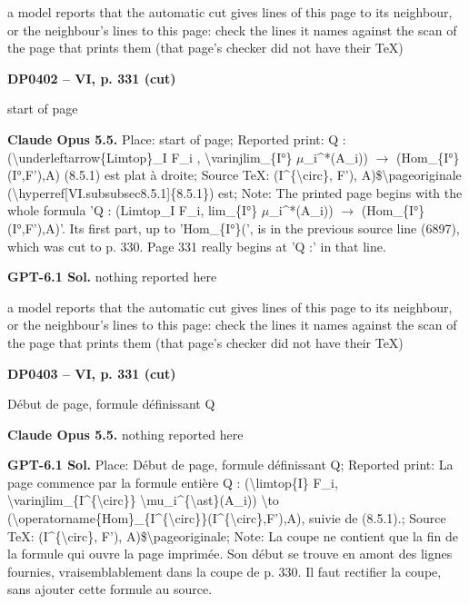 a model reports that the automatic cut gives lines of this page to its neighbour, or the neighbour's lines to this page: check the lines it names against the scan of the page that prints them (that page's checker did not have their TeX)\par
\par\noindent\hypertarget{DP0402}{}\textbf{DP0402 -- VI, p. 331 (cut)}\par
start of page\par
\textbf{Claude Opus 5.5.} Place: start of page; Reported print: Q : (\textbackslash{}underleftarrow\{Limtop\}\_I F\_i , \textbackslash{}varinjlim\_\{I°\} \ensuremath{\mu}\_i\textasciicircum{}*(A\_i)) \ensuremath{\longrightarrow} (Hom\_\{I°\}(I°,F'),A) (8.5.1) est plat à droite; Source TeX: (I\textasciicircum{}\{\textbackslash{}circ\}, F'), A)\$\textbackslash{}pageoriginale (\textbackslash{}hyperref[VI.subsubsec8.5.1]\{8.5.1\}) est; Note: The printed page begins with the whole formula 'Q : (Limtop\_I F\_i, lim\_\{I°\} \ensuremath{\mu}\_i\textasciicircum{}*(A\_i)) \ensuremath{\to} (Hom\_\{I°\}(I°,F'),A)'. Its first part, up to 'Hom\_\{I°\}(', is in the previous source line (6897), which was cut to p. 330. Page 331 really begins at 'Q :' in that line.\par
\textbf{GPT-6.1 Sol.} nothing reported here\par
a model reports that the automatic cut gives lines of this page to its neighbour, or the neighbour's lines to this page: check the lines it names against the scan of the page that prints them (that page's checker did not have their TeX)\par
\par\noindent\hypertarget{DP0403}{}\textbf{DP0403 -- VI, p. 331 (cut)}\par
Début de page, formule définissant Q\par
\textbf{Claude Opus 5.5.} nothing reported here\par
\textbf{GPT-6.1 Sol.} Place: Début de page, formule définissant Q; Reported print: La page commence par la formule entière Q : (\textbackslash{}limtop\{I\} F\_i, \textbackslash{}varinjlim\_\{I\textasciicircum{}\{\textbackslash{}circ\}\} \textbackslash{}mu\_i\textasciicircum{}\{\textbackslash{}ast\}(A\_i)) \textbackslash{}to (\textbackslash{}operatorname\{Hom\}\_\{I\textasciicircum{}\{\textbackslash{}circ\}\}(I\textasciicircum{}\{\textbackslash{}circ\},F'),A), suivie de (8.5.1).; Source TeX: (I\textasciicircum{}\{\textbackslash{}circ\}, F'), A)\$\textbackslash{}pageoriginale; Note: La coupe ne contient que la fin de la formule qui ouvre la page imprimée. Son début se trouve en amont des lignes fournies, vraisemblablement dans la coupe de p. 330. Il faut rectifier la coupe, sans ajouter cette formule au source.\par
